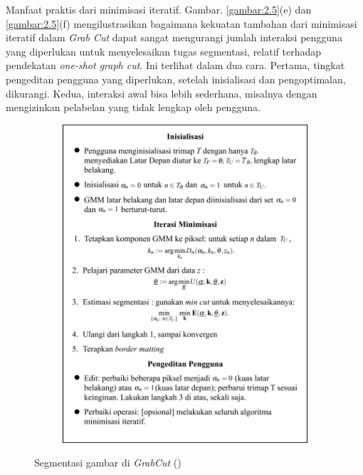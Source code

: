 Manfaat praktis dari minimisasi iteratif. Gambar. \ref{gambar:2.5}(e) dan \ref{gambar:2.5}(f) 
mengilustrasikan bagaimana kekuatan tambahan dari minimisasi iteratif dalam 
\emph{Grab Cut} dapat sangat mengurangi jumlah interaksi pengguna yang diperlukan 
untuk menyelesaikan tugas segmentasi, relatif terhadap pendekatan \emph{one-shot graph cut}. 
Ini terlihat dalam dua cara. Pertama, tingkat pengeditan pengguna yang diperlukan, 
setelah inisialisasi dan pengoptimalan, dikurangi. Kedua, interaksi awal bisa lebih 
sederhana, misalnya dengan mengizinkan pelabelan yang tidak lengkap oleh pengguna.

\begin{figure}[H]
  \centering
    \begin{subfigure}{0.5\textwidth}
      \centering{}
      \includegraphics[width=\textwidth]{gambar/gambar-2_6.png}
    \end{subfigure}     
  \caption{
    Segmentasi gambar di \emph{GrabCut} (\cite{Rother:2004})
    }
  \label{gambar:2.6}
\end{figure}


